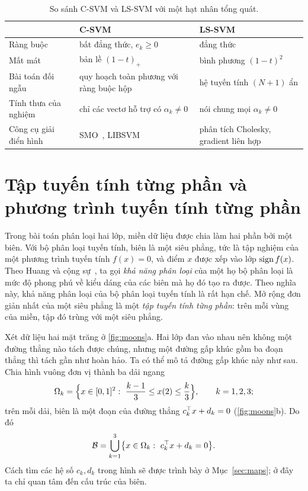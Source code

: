 \begin{table}[t]
\centering
\caption[So sánh C-SVM và LS-SVM]{So sánh C-SVM và LS-SVM với một hạt nhân tổng quát.}
\label{tab:csvm-lssvm}
\small
\renewcommand{\arraystretch}{1.25}
\begin{tabularx}{\linewidth}{@{}l X X@{}}
\toprule
& \textbf{C-SVM} & \textbf{LS-SVM}\\
\midrule
Ràng buộc & bất đẳng thức, $e_k\ge0$ & đẳng thức\\
Mất mát & bản lề $(1-t)_+$ & bình phương $(1-t)^2$\\
Bài toán đối ngẫu & quy hoạch toàn phương với ràng buộc hộp & hệ tuyến tính $(N+1)$ ẩn\\
Tính thưa của nghiệm & chỉ các vectơ hỗ trợ có $\alpha_k\neq0$ & nói chung mọi $\alpha_k\neq0$\\
Công cụ giải điển hình & SMO~\cite{platt1999}, LIBSVM~\cite{chang2011} & phân tích Cholesky, gradient liên hợp\\
\bottomrule
\end{tabularx}
\end{table}

\section{Tập tuyến tính từng phần và phương trình tuyến tính từng phần}\label{sec:pwlset}

Trong bài toán phân loại hai lớp, miền dữ liệu được chia làm hai phần bởi một biên. Với bộ phân loại tuyến tính, biên là một siêu phẳng, tức là tập nghiệm của một phương trình tuyến tính $f(x)=0$, và điểm $x$ được xếp vào lớp $\operatorname{sign} f(x)$. Theo Huang và cộng sự~\cite{huang2013}, ta gọi \emph{khả năng phân loại} của một họ bộ phân loại là mức độ phong phú về kiểu dáng của các biên mà họ đó tạo ra được. Theo nghĩa này, khả năng phân loại của bộ phân loại tuyến tính là rất hạn chế. Mở rộng đơn giản nhất của một siêu phẳng là một \emph{tập tuyến tính từng phần}: trên mỗi vùng của miền, tập đó trùng với một siêu phẳng.

Xét dữ liệu hai mặt trăng ở \cref{fig:moons}a. Hai lớp đan vào nhau nên không một đường thẳng nào tách được chúng, nhưng một đường gấp khúc gồm ba đoạn thẳng thì tách gần như hoàn hảo. Ta có thể mô tả đường gấp khúc này như sau. Chia hình vuông đơn vị thành ba dải ngang
\[
\Omega_k=\Bigl\{x\in[0,1]^2:\ \frac{k-1}{3}\le x(2)\le\frac{k}{3}\Bigr\},\qquad k=1,2,3;
\]
trên mỗi dải, biên là một đoạn của đường thẳng $c_k^\top x+d_k=0$ (\cref{fig:moons}b). Do đó
\[
\mathcal{B}=\bigcup_{k=1}^{3}\bigl\{x\in\Omega_k:\ c_k^\top x+d_k=0\bigr\}.
\]
Cách tìm các hệ số $c_k,d_k$ trong hình sẽ được trình bày ở Mục~\ref{sec:maps}; ở đây ta chỉ quan tâm đến cấu trúc của biên.

